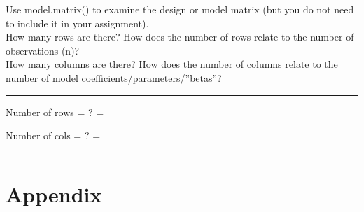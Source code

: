 \documentclass[
]{article}
\newenvironment{Shaded}{\begin{snugshade}}{\end{snugshade}}
\newcommand{\AttributeTok}[1]{\textcolor[rgb]{0.13,0.29,0.53}{#1}}
\newcommand{\CommentTok}[1]{\textcolor[rgb]{0.56,0.35,0.01}{\textit{#1}}}
\newcommand{\ConstantTok}[1]{\textcolor[rgb]{0.56,0.35,0.01}{#1}}
\newcommand{\FunctionTok}[1]{\textcolor[rgb]{0.13,0.29,0.53}{\textbf{#1}}}
\newcommand{\NormalTok}[1]{#1}
\newcommand{\SpecialCharTok}[1]{\textcolor[rgb]{0.81,0.36,0.00}{\textbf{#1}}}
\begin{document}
Use model.matrix() to examine the design or model matrix (but you do not
need to include it in your assignment).\\
How many rows are there? How does the number of rows relate to the
number of observations (n)?\\
How many columns are there? How does the number of columns relate to the
number of model coefficients/parameters/''betas''?\\

\begin{center}\rule{0.5\linewidth}{0.5pt}\end{center}

Number of rows = ? =

Number of cols = ? =

\begin{center}\rule{0.5\linewidth}{0.5pt}\end{center}

\hypertarget{appendix}{%
\section{Appendix}\label{appendix}}

\begin{Shaded}
\end{Shaded}
\end{document}
